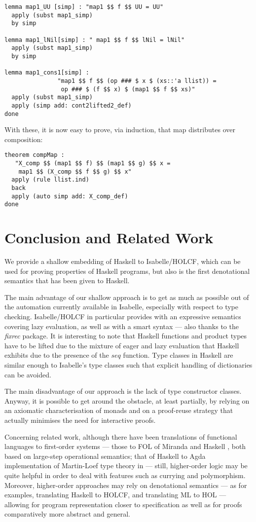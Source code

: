 \documentclass{llncs}
\begin{document}
\begin{verbatim}
lemma map1_UU [simp] : "map1 $$ f $$ UU = UU"
  apply (subst map1_simp) 
  by simp

lemma map1_lNil[simp] : " map1 $$ f $$ lNil = lNil"
  apply (subst map1_simp) 
  by simp

lemma map1_cons1[simp] : 
               "map1 $$ f $$ (op ### $ x $ (xs::'a llist)) =
                op ### $ (f $$ x) $ (map1 $$ f $$ xs)"
  apply (subst map1_simp)
  apply (simp add: cont2lifted2_def)
done
\end{verbatim}

\noindent With these, it is now easy to prove, via induction, that map
distributes over composition:
\begin{verbatim}
theorem compMap : 
   "X_comp $$ (map1 $$ f) $$ (map1 $$ g) $$ x = 
    map1 $$ (X_comp $$ f $$ g) $$ x"
  apply (rule llist.ind)
  back
  apply (auto simp add: X_comp_def)
done
\end{verbatim}

\section{Conclusion and Related Work}
\label{sec:conclusion}

We provide a shallow embedding of Haskell to Isabelle/HOLCF,
which can be used for proving properties of Haskell programs,
but also is the first denotational semantics that has been
given to Haskell.

The main advantage of our shallow approach is to get as much as
possible out of the automation currently available in Isabelle,
especially with respect to type checking. Isabelle/HOLCF in particular
provides with an expressive semantics covering lazy evaluation, as
well as with a smart syntax --- also thanks to the \emph{fixrec}
package. It is interesting to note that Haskell functions and product
types have to be lifted due to the mixture of eager and lazy evaluation
that Haskell exhibits due to the presence of the $seq$ function.
Type classes in Haskell are similar enough to Isabelle's type classes
such that explicit handling of dictionaries can be avoided.

The main disadvantage of our approach is the lack of type
constructor classes. Anyway, it is possible to get around the
obstacle, at least partially, by relying on an axiomatic
characterisation of monads and on a proof-reuse strategy that actually
minimises the need for interactive proofs.

Concerning related work, although there have been translations of
functional languages to first-order systems --- those to FOL of
Miranda \cite{Thompson95,Thompson89,Thompson95b} and Haskell
\cite{Thompson92}, both based on large-step operational semantics;
that of Haskell to Agda implementation of Martin-Loef type theory in
\cite{Abel} --- still, higher-order logic may be quite helpful in
order to deal with features such as currying and polymorphism.
Moreover, higher-order approaches may rely on denotational semantics
--- as for examples, \cite{Huff} translating Haskell to HOLCF, and
\cite{Pollack} translating ML to HOL --- allowing for program
representation closer to specification as well as for proofs
comparatively more abstract and general.
\end{document}

